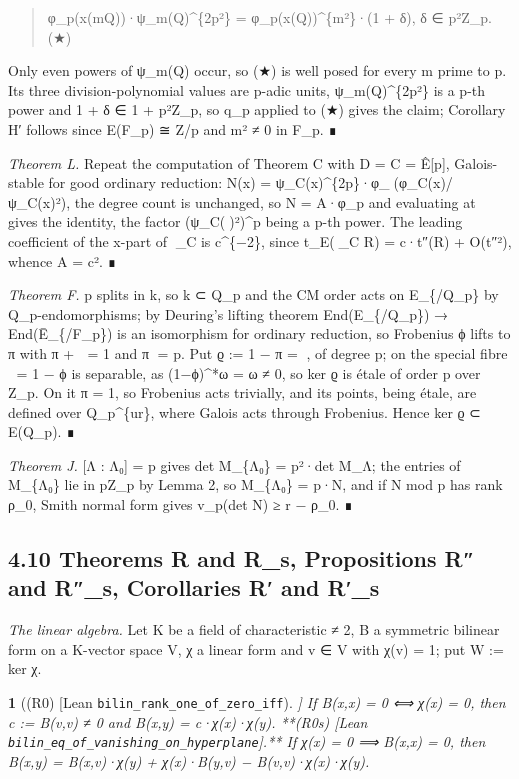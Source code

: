 \documentclass[11pt,a4paper]{article}
\theoremstyle{named}
\newtheorem*{namedthm}{}
\begin{document}
\begin{quote}
φ\_p(x(mQ))·ψ\_m(Q)\textasciicircum{}\{2p²\} = φ\_p(x(Q))\textasciicircum{}\{m²\}·(1 + δ),  δ ∈ p²Z\_p.  (★)
\end{quote}

Only even powers of ψ\_m(Q) occur, so (★) is well posed for every m prime to p. Its three division-polynomial values are p-adic units, ψ\_m(Q)\textasciicircum{}\{2p²\} is a p-th power and 1 + δ ∈ 1 + p²Z\_p, so q\_p applied to (★) gives the claim; Corollary H′ follows since E(F\_p) ≅ Z/p and m² ≠ 0 in F\_p. ∎

\textit{Theorem L.} Repeat the computation of Theorem C with D = C = Ê[p], Galois-stable for good ordinary reduction: N(x) = ψ\_C(x)\textasciicircum{}\{2p\}·φ\_(φ\_C(x)/ψ\_C(x)²), the degree count is unchanged, so N = A·φ\_p and evaluating at  gives the identity, the factor (ψ\_C()²)\textasciicircum{}p being a p-th power. The leading coefficient of the x-part of \_C is c\textasciicircum{}\{−2\}, since t\_E(\_C R) = c·t″(R) + O(t″²), whence A = c². ∎

\textit{Theorem F.} p splits in k, so k ⊂ Q\_p and the CM order acts on E\_\{/Q\_p\} by Q\_p-endomorphisms; by Deuring's lifting theorem End(E\_\{/Q\_p\}) → End(Ē\_\{/F\_p\}) is an isomorphism for ordinary reduction, so Frobenius ϕ lifts to π with π +  = 1 and π = p. Put ϱ := 1 − π = , of degree p; on the special fibre  = 1 − ϕ is separable, as (1−ϕ)\textasciicircum{}*ω = ω ≠ 0, so ker ϱ is étale of order p over Z\_p. On it π = 1, so Frobenius acts trivially, and its points, being étale, are defined over Q\_p\textasciicircum{}\{ur\}, where Galois acts through Frobenius. Hence ker ϱ ⊂ E(Q\_p). ∎

\textit{Theorem J.} [Λ : Λ₀] = p gives det M\_\{Λ₀\} = p²·det M\_Λ; the entries of M\_\{Λ₀\} lie in pZ\_p by Lemma 2, so M\_\{Λ₀\} = p·N, and if N mod p has rank ρ\_0, Smith normal form gives v\_p(det N) ≥ r − ρ\_0. ∎

\subsection*{4.10 Theorems R and R\_s, Propositions R″ and R″\_s, Corollaries R′ and R′\_s}

\textit{The linear algebra.} Let K be a field of characteristic ≠ 2, B a symmetric bilinear form on a K-vector space V, χ a linear form and v ∈ V with χ(v) = 1; put W := ker χ.

\begin{namedthm}[(R0) [Lean \texttt{bilin\_\allowbreak{}rank\_\allowbreak{}one\_\allowbreak{}of\_\allowbreak{}zero\_\allowbreak{}iff}]]
If B(x,x) = 0 ⟺ χ(x) = 0, then c := B(v,v) ≠ 0 and B(x,y) = c·χ(x)·χ(y).
**(R0s) [Lean \texttt{bilin\_\allowbreak{}eq\_\allowbreak{}of\_\allowbreak{}vanishing\_\allowbreak{}on\_\allowbreak{}hyperplane}].** If χ(x) = 0 ⟹ B(x,x) = 0, then B(x,y) = B(x,v)·χ(y) + χ(x)·B(y,v) − B(v,v)·χ(x)·χ(y).
\end{namedthm}
\end{document}
